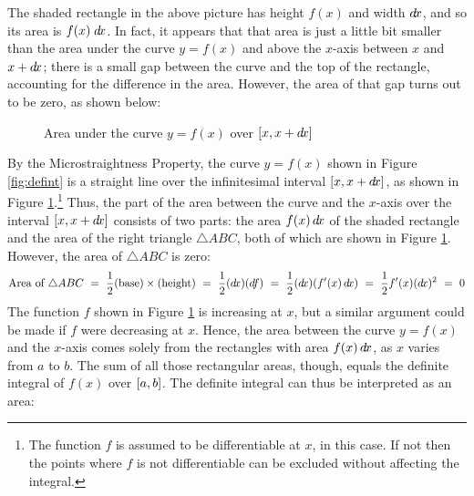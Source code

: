 The shaded rectangle in the above picture has height $f(x)$ and width $d\!x$, and
so its area is $f(x)\;d\!x$. In fact, it appears that that area is just a little
bit smaller than the area under the curve $y=f(x)$ and above the $x$-axis
between $x$ and $x+d\!x$; there is a small gap between the curve and the top of
the rectangle, accounting for the difference in the area. However, the area of
that gap turns out to be zero, as shown below:
\newpage
\begin{figure}[ht]
 \begin{center}
  \vspace{-5mm}
 \end{center}
 \caption[]{\quad Area under the curve $y=f(x)$ over $\lbrack x,x+d\!x \rbrack$}
 \label{fig:defintinf}
\end{figure}

By the Microstraightness Property, the curve $y=f(x)$ shown in Figure
\ref{fig:defint} is a straight line over the infinitesimal interval
$\lbrack x,x+d\!x \rbrack$, as shown in Figure \ref{fig:defintinf}.\footnote{The function
$f$ is assumed to be differentiable at $x$, in this case. If not then the points
where $f$ is not differentiable can be excluded without affecting the integral.}
Thus, the part of the area between the curve and the $x$-axis over the interval
$\lbrack x,x+d\!x \rbrack$ consists of two parts: the area $f(x)\,d\!x$ of the shaded
rectangle and the area of the right triangle $\triangle ABC$, both of which are
shown in Figure \ref{fig:defintinf}. However, the area of $\triangle ABC$ is
zero:
\[
\text{Area of }\triangle ABC ~=~ \frac{1}{2}\text{(base)}\times\text{(height)}
 ~=~ \frac{1}{2}(d\!x)(d\negmedspace f) ~=~ \frac{1}{2}(d\!x)(f'(x)\,d\!x) ~=~
\frac{1}{2}f'(x)(d\!x)^2 ~=~ 0
\]
The function $f$ shown in Figure \ref{fig:defintinf} is increasing at
$x$, but a similar argument could be made if $f$ were decreasing at $x$.
Hence, the area between the curve $y=f(x)$ and the $x$-axis comes solely from
the rectangles with area $f(x)\,d\!x$, as $x$ varies from $a$ to $b$. The sum of
all those rectangular areas, though, equals the definite integral of $f(x)$ over
$\lbrack a,b \rbrack$. The definite integral can thus be interpreted as an area:

